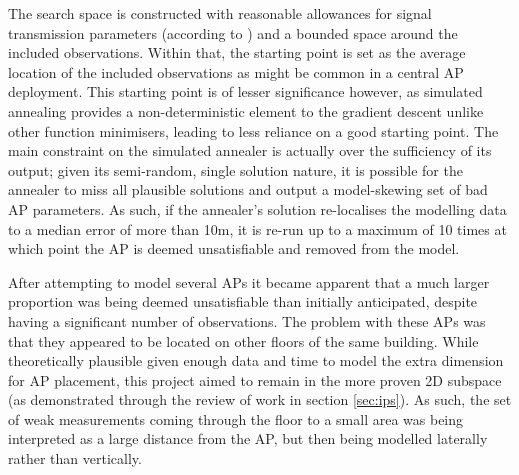 \documentclass{UoYCSproject}
\begin{document}
                The search space is constructed with reasonable allowances for signal transmission parameters (according to \citet{chintalapudi2010indoor}) and a bounded space around the included observations. Within that, the starting point is set as the average location of the included observations as might be common in a central AP deployment. This starting point is of lesser significance however, as simulated annealing provides a non-deterministic element to the gradient descent unlike other function minimisers, leading to less reliance on a good starting point. The main constraint on the simulated annealer is actually over the sufficiency of its output; given its semi-random, single solution nature, it is possible for the annealer to miss all plausible solutions and output a model-skewing set of bad AP parameters. As such, if the annealer's solution re-localises the modelling data to a median error of more than 10m, it is re-run up to a maximum of 10 times at which point the AP is deemed unsatisfiable and removed from the model.
                
                After attempting to model several APs it became apparent that a much larger proportion was being deemed unsatisfiable than initially anticipated, despite having a significant number of observations. The problem with these APs was that they appeared to be located on other floors of the same building. While theoretically plausible given enough data and time to model the extra dimension for AP placement, this project aimed to remain in the more proven 2D subspace (as demonstrated through the review of work in section \ref{sec:ips}). As such, the set of weak measurements coming through the floor to a small area was being interpreted as a large distance from the AP, but then being modelled laterally rather than vertically.
                
\end{document}
